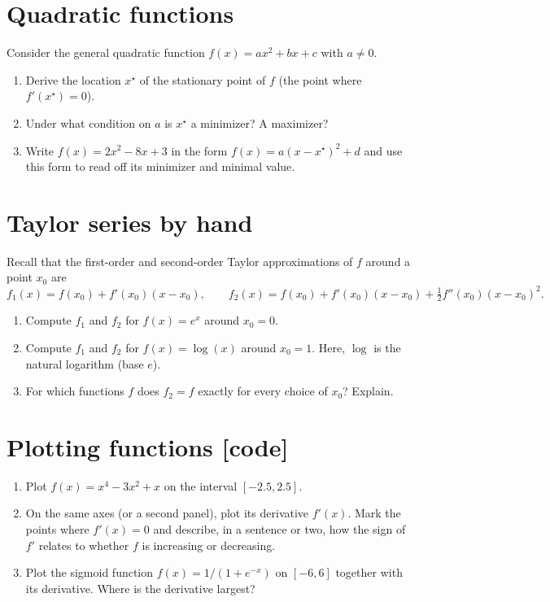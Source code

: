 \documentclass[letterpaper]{article}
\newcommand{\opt}{^\star}
\begin{document}
\section{Quadratic functions}
Consider the general quadratic function $f(x) = a x^2 + b x + c$ with $a \neq 0$.
\begin{enumerate}
\item Derive the location $x\opt$ of the stationary point of $f$ (the point where $f'(x\opt) = 0$).
\item Under what condition on $a$ is $x\opt$ a minimizer? A maximizer?
\item Write $f(x) = 2x^2 - 8x + 3$ in the form $f(x) = a(x - x\opt)^2 + d$ and use this form to read off its minimizer and minimal value.
\end{enumerate}

\section{Taylor series by hand}
Recall that the first-order and second-order Taylor approximations of $f$ around a point $x_0$ are
\[
f_1(x) = f(x_0) + f'(x_0)(x - x_0), \qquad
f_2(x) = f(x_0) + f'(x_0)(x - x_0) + \tfrac{1}{2} f''(x_0)(x - x_0)^2 .
\]
\begin{enumerate}
\item Compute $f_1$ and $f_2$ for $f(x) = e^x$ around $x_0 = 0$.
\item Compute $f_1$ and $f_2$ for $f(x) = \log(x)$ around $x_0 = 1$. Here, $\log$ is the natural logarithm (base $e$).
\item For which functions $f$ does $f_2 = f$ exactly for every choice of $x_0$? Explain.
\end{enumerate}

\section{Plotting functions \textbf{[code]}}
\begin{enumerate}
\item Plot $f(x) = x^4 - 3x^2 + x$ on the interval $[-2.5, 2.5]$.
\item On the same axes (or a second panel), plot its derivative $f'(x)$. Mark the points where $f'(x) = 0$ and describe, in a sentence or two, how the sign of $f'$ relates to whether $f$ is increasing or decreasing.
\item Plot the sigmoid function $f(x) = 1/(1 + e^{-x})$ on $[-6, 6]$ together with its derivative. Where is the derivative largest?
\end{enumerate}
\end{document}
